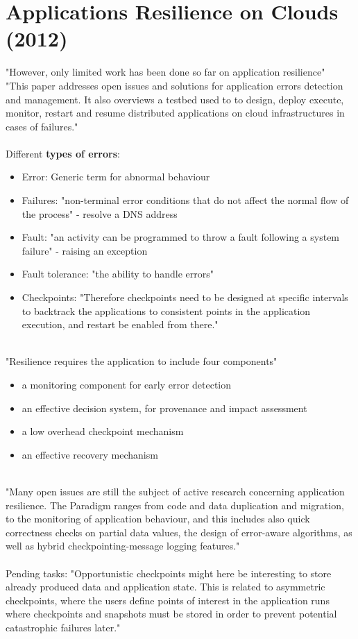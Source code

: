 \section{Applications Resilience on Clouds (2012)}
"However, only limited work has been done so far on application resilience" \\
"This paper addresses open issues and solutions for application errors detection and management. It also overviews a testbed used to to design, deploy execute, monitor, restart and resume distributed applications on cloud infrastructures in cases of failures." \\
\\
Different \textbf{types of errors}:
\begin{itemize}
  \item Error: Generic term for abnormal behaviour
  \item Failures: "non-terminal error conditions that do not affect the normal flow of the process" - resolve a DNS address
  \item Fault: "an activity can be programmed to throw a fault following a system failure" - raising an exception
  \item Fault tolerance: "the ability to handle errors"
  \item Checkpoints: "Therefore checkpoints need to be designed at specific intervals to backtrack the applications to consistent points in the application execution, and restart be enabled from there."
\end{itemize}
\noindent
\\
"Resilience requires the application to include four components"
\begin{itemize}
  \item a monitoring component for early error detection
  \item an effective decision system, for provenance and impact assessment
  \item a low overhead checkpoint mechanism
  \item an effective recovery mechanism
\end{itemize}
\noindent
\\
"Many open issues are still the subject of active research concerning application resilience. The Paradigm ranges from code and data duplication and migration, to the monitoring of application behaviour, and this includes also quick correctness checks on partial data values, the design of error-aware algorithms, as well as hybrid checkpointing-message logging features."
\\ \\
Pending tasks: "Opportunistic checkpoints might here be interesting to store already produced data and application state. This is related to asymmetric checkpoints, where the users define points of interest in the application runs where checkpoints and snapshots must be stored in order to prevent potential catastrophic failures later."